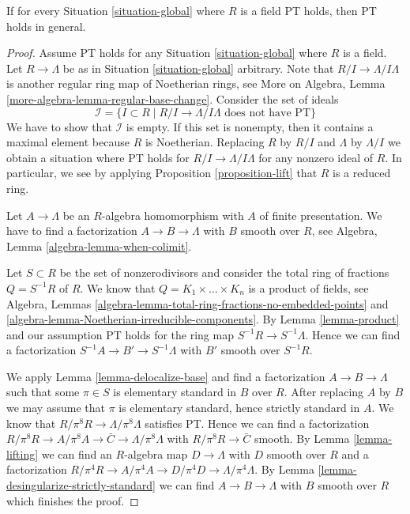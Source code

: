 \begin{lemma}
\label{lemma-reduce-to-field}
If for every Situation \ref{situation-global} where $R$
is a field PT holds, then PT holds in general.
\end{lemma}

\begin{proof}
Assume PT holds for any Situation \ref{situation-global} where $R$ is a field.
Let $R \to \Lambda$ be as in Situation \ref{situation-global} arbitrary.
Note that $R/I \to \Lambda/I\Lambda$ is another regular ring map
of Noetherian rings, see
More on Algebra, Lemma \ref{more-algebra-lemma-regular-base-change}.
Consider the set of ideals
$$
\mathcal{I} = \{I \subset R \mid R/I \to \Lambda/I\Lambda
\text{ does not have PT}\}
$$
We have to show that $\mathcal{I}$ is empty. If this set is nonempty,
then it contains a maximal element because $R$ is Noetherian.
Replacing $R$ by $R/I$ and $\Lambda$ by $\Lambda/I$ we obtain a
situation where PT holds for $R/I \to \Lambda/I\Lambda$ for any
nonzero ideal of $R$. In particular, we see by applying
Proposition \ref{proposition-lift}
that $R$ is a reduced ring.

\medskip\noindent
Let $A \to \Lambda$ be an $R$-algebra homomorphism with $A$ of
finite presentation. We have to find a factorization $A \to B \to \Lambda$
with $B$ smooth over $R$, see Algebra, Lemma \ref{algebra-lemma-when-colimit}.

\medskip\noindent
Let $S \subset R$ be the set of nonzerodivisors and
consider the total ring of fractions $Q = S^{-1}R$ of $R$. We know that
$Q = K_1 \times \ldots \times K_n$ is a product of fields, see
Algebra, Lemmas \ref{algebra-lemma-total-ring-fractions-no-embedded-points} and
\ref{algebra-lemma-Noetherian-irreducible-components}.
By Lemma \ref{lemma-product} and our assumption
PT holds for the ring map $S^{-1}R \to S^{-1}\Lambda$.
Hence we can find a factorization $S^{-1}A \to B' \to S^{-1}\Lambda$
with $B'$ smooth over $S^{-1}R$.

\medskip\noindent
We apply Lemma \ref{lemma-delocalize-base}
and find a factorization $A \to B \to \Lambda$ such that
some $\pi \in S$ is elementary standard in $B$ over $R$.
After replacing $A$ by $B$ we may assume that $\pi$ is
elementary standard, hence strictly standard in $A$. We know that
$R/\pi^8R \to \Lambda/\pi^8\Lambda$ satisfies PT.
Hence we can find a factorization
$R/\pi^8 R \to A/\pi^8A \to \bar C \to \Lambda/\pi^8\Lambda$
with $R/\pi^8 R \to \bar C$ smooth. By
Lemma \ref{lemma-lifting}
we can find an $R$-algebra map $D \to \Lambda$ with $D$ smooth over $R$
and a factorization
$R/\pi^4 R \to A/\pi^4A \to D/\pi^4D \to \Lambda/\pi^4\Lambda$.
By Lemma \ref{lemma-desingularize-strictly-standard}
we can find $A \to B \to \Lambda$ with $B$ smooth over $R$
which finishes the proof.
\end{proof}










